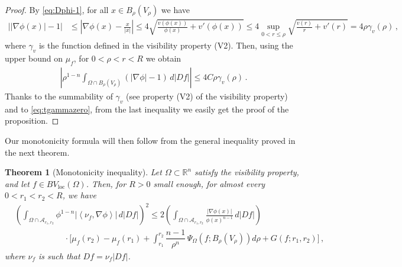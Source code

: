 \documentclass[a4paper,reqno,11pt]{amsart}
\newtheorem{theorem}{Theorem}[section]
\newcommand{\R}{\mathbb{R}}
\newcommand{\loc}{\mathop{\mathrm{loc}}}
\newcommand{\cA}{\mathcal{A}}
\begin{document}
\begin{proof}
By \eqref{eq:Dphi-1}, for all $x\in B_{\rho}(V_{\rho})$ we have
\begin{align*}
\left||\nabla \phi(x)| - 1\right| &\le \left|\nabla \phi(x) - \frac{x}{|x|}\right|\le 4\sqrt{\frac{v(\phi(x))}{\phi(x)} + v'(\phi(x))} \le 4\sup_{0<r\le \rho} \sqrt{\frac{v(r)}{r} + v'(r)} = 4\rho \gamma_{v}(\rho)\,,
\end{align*}
where $\gamma_{v}$ is the function defined in the visibility property (V2). Then, using the upper bound on $\mu_{f}$, for $0<\rho<r<R$ we obtain
\begin{align*}
\left|\rho^{1-n} \int_{\Omega\cap B_{\rho}(V_{\rho})} (|\nabla \phi|-1)\, d|Df|\right| \le 4C\rho \gamma_{v}(\rho)\,.
\end{align*}
Thanks to the summability of $\gamma_{v}$ (see property (V2) of the visibility property) and to \eqref{eq:tgammazero}, from the last inequality we easily get the proof of the proposition. 
\end{proof}
%
Our monotonicity formula will then follow from the general inequality proved in the next theorem.
\begin{theorem}[Monotonicity inequality] \label{thm:MonotonicityInequality}
Let $\Omega \subset \R^{n}$ satisfy the visibility property, and let $f \in BV_{\loc}(\Omega)$. Then, for $R > 0$ small enough, for almost every $0 < r_{1} < r_{2} < R$, we have
\begin{align} \label{eq:finalmonotfBV}
& \left( \int_{\Omega \cap \cA_{r_{1},r_{2}}} \phi^{1-n} \left|\left\langle \nu_f, \nabla \phi \right\rangle \right| \, d |Df| \right)^{2} \leq 2\left( \int_{\Omega \cap \cA_{r_{1},r_{2}}} \frac{|\nabla \phi(x)|}{\phi(x)^{n-1}}\, d |Df| \right)\nonumber \\
& \qquad \qquad \qquad \cdot \bigg[\mu_{f}(r_{2}) - \mu_{f}(r_{1}) + \int_{r_{1}}^{r_{2}} \dfrac{n-1}{\rho^{n}} \, \Psi_{\Omega}(f;B_{\rho}(V_{\rho})) d \rho + G(f;r_1,r_{2}) \bigg] \, ,
\end{align}
where $\nu_f$ is such that $Df = \nu_{f}|Df|$.
\end{theorem}
\end{document}
